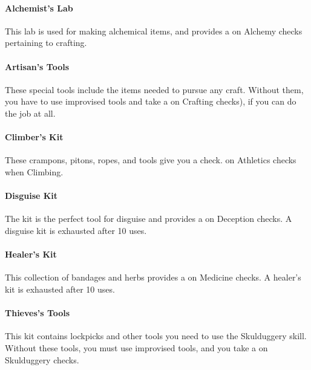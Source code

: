 \begin{multicols}{2}

\paragraph{Alchemist's Lab} \label{kititm:alchemistslab}
This lab is used for making alchemical items, and
provides a \boost on Alchemy checks pertaining to crafting.

\paragraph{Artisan's Tools} \label{kititm:artisanstools}
These special tools include the items needed to pursue
any craft. Without them, you have to use improvised
tools and take a \setback on Crafting checks), if you
can do the job at all.

\paragraph{Climber's Kit} \label{kititm:climberskit}
These crampons, pitons, ropes, and tools give you a \boost check.
on Athletics checks when Climbing.

\paragraph{Disguise Kit} \label{kititm:disguisekit}
The kit is the perfect tool for disguise and provides a \boost
on Deception checks. A disguise kit is exhausted after
10 uses.

\paragraph{Healer's Kit} \label{kititm:healerskit}
This collection of bandages and herbs provides a \boost on
Medicine checks. A healer's kit is exhausted after 10
uses.

\paragraph{Thieves's Tools} \label{kititm:thievestools}
This kit contains lockpicks and other tools you need to
use the Skulduggery skill. Without these tools, you must
use improvised tools, and you take a \setback on Skulduggery
checks.

\end{multicols}
